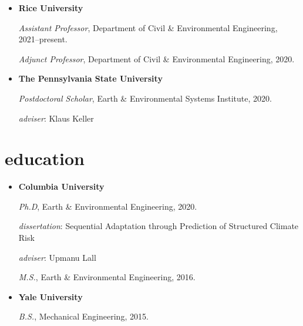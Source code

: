 \documentclass[10pt,oneside]{article}
\begin{document}
\mbox{}\vspace{-\dimexpr\baselineskip\relax}

\begin{itemize}[label={}]

  \item \textbf{Rice University}

        \textit{Assistant Professor}, Department of Civil \& Environmental Engineering, 2021--present.


        \textit{Adjunct Professor}, Department of Civil \& Environmental Engineering, 2020.



  \item \textbf{The Pennsylvania State University}

        \textit{Postdoctoral Scholar}, Earth \& Environmental Systems Institute, 2020.


        \quad \textit{adviser}: Klaus Keller




\end{itemize}


\section{education}

\mbox{}\vspace{-\dimexpr\baselineskip\relax}

\begin{itemize}[label={}]

  \item \textbf{Columbia University}

        \textit{Ph.D}, Earth \& Environmental Engineering, 2020.


        \quad \textit{dissertation}: Sequential Adaptation through Prediction of Structured Climate Risk

        \quad \textit{adviser}: Upmanu Lall



        \textit{M.S.}, Earth \& Environmental Engineering, 2016.



  \item \textbf{Yale University}

        \textit{B.S.}, Mechanical Engineering, 2015.



\end{itemize}
\end{document}
